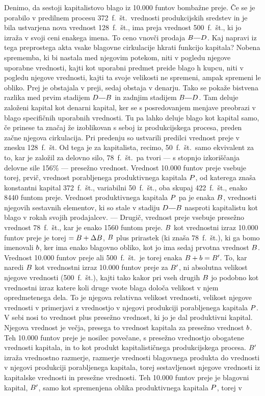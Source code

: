 \documentclass[kapital_02.tex]{subfiles}
\begin{document}
Denimo, da sestoji kapitalistovo blago iz 10.000 funtov bombažne preje. Če se je porabilo v predilnem procesu 372~f.~št.\ vrednosti produkcijskih sredstev in je bila ustvarjena nova vrednost 128~f.~št., ima preja vrednost 500~f.~št., ki jo izraža v svoji ceni enakega imena. To ceno vnovči prodaja \(\KPEB\KPEcrta\KPED\). Kaj napravi iz tega preprostega akta vsake blagovne cirkulacije hkrati funkcijo kapitala? Nobena sprememba, ki bi nastala med njegovim potekom, niti v pogledu njegove uporabne vrednosti, kajti kot uporabni predmet preide blago h kupcu, niti v pogledu njegove vrednosti, kajti ta svoje velikosti ne spremeni, ampak spremeni le obliko. Prej je obstajala v preji, sedaj obstaja v denarju. Tako se pokaže bistvena razlika med prvim stadijem \(\KPED\KPEcrta\KPEB\) in zadnjim stadijem \(\KPEB\KPEcrta\KPED\). Tam deluje založeni kapital kot denarni kapital, ker se s posredovanjem menjave preobrazi v blago specifičnih uporabnih vrednosti. Tu pa lahko deluje blago kot kapital samo, če prinese ta značaj že izoblikovan s seboj iz produkcijskega procesa, preden začne njegova cirkulacija. Pri predenju so ustvarili predilci vrednost preje v znesku 128~f.~št. Od tega je za kapitalista, recimo, 50~f.~št.\ samo ekvivalent za to, kar je založil za delovno silo, 78~f.~št.\ pa tvori --- s stopnjo izkoriščanja delovne sile 156\% --- presežno vrednost. Vrednost 10.000 funtov preje vsebuje torej, prvič, vrednost porabljenega produktivnega kapitala \(P\), od katerega znaša konstantni kapital 372~f.~št., variabilni 50~f.~št., oba skupaj 422~f.~št., enako 8440 funtom preje. Vrednost produktivnega kapitala \(P\) pa je enaka \(B\), vrednosti njegovih sestavnih elementov, ki so stale v stadiju \(\KPED\KPEcrta\KPEB\) nasproti kapitalistu kot blago v rokah svojih prodajalcev. --- Drugič, vrednost preje vsebuje presežno vrednost 78~f.~št., kar je enako 1560 funtom preje. \(B\) kot vrednostni izraz 10.000 funtov preje je torej \(= B + \Delta B\), \(B\) plus prirastek (ki znaša 78~f.~št.), ki ga bomo imenovali \(b\), ker ima enako blagovno obliko, kot jo ima sedaj prvotna vrednost \(B\). Vrednost 10.000 funtov preje ali 500~f.~št.\ je torej enaka \(B + b = B'\). To, kar naredi \(B\) kot vrednostni izraz 10.000 funtov preje za \(B'\), ni absolutna velikost njegove vrednosti (500~f.~št.), kajti tako kakor pri vseh drugih \(B\) jo podobno kot vrednostni izraz katere koli druge vsote blaga določa velikost v njem opredmetenega dela. To je njegova relativna velikost vrednosti, velikost njegove vrednosti v primerjavi z vrednostjo v njegovi produkciji porabljenega kapitala \(P\). V sebi nosi to vrednost plus presežno vrednost, ki jo je dal produktivni kapital. Njegova vrednost je večja, presega to vrednost kapitala za presežno vrednost \(b\). Teh 10.000 funtov preje je nosilec povečane, s presežno vrednostjo obogatene vrednosti kapitala, in to kot produkt kapitalističnega produkcijskega procesa. \(B'\) izraža vrednostno razmerje, razmerje vrednosti blagovnega produkta do vrednosti v njegovi produkciji porabljenega kapitala, torej sestavljenost njegove vrednosti iz kapitalske vrednosti in presežne vrednosti. Teh 10.000 funtov preje je blagovni kapital, \(B'\), samo kot spremenjena oblika produktivnega kapitala \(P\), torej v 
\end{document}
